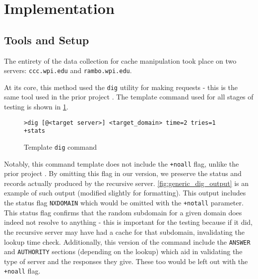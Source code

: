 \section{Implementation}\label{sec:dns_impl} %

\subsection{Tools and Setup}

The entirety of the data collection for \dns cache manipulation took place on two \wpi servers: \texttt{ccc.wpi.edu} and \texttt{rambo.wpi.edu}.

At its core, this method used the \texttt{dig} utility for making \dns requests - this is the same tool used in the prior project \cite{Fakult2019}. The template command used for all stages of testing is shown in \cref{fig:dig_template_command}.

\begin{figure}[h]
    \centering
    \begin{verbatim}
>dig [@<target server>] <target_domain> time=2 tries=1 +stats
    \end{verbatim}
    \caption{Template \texttt{dig} command}
    \label{fig:dig_template_command}
\end{figure}

Notably, this command template does not include the \texttt{+noall} flag, unlike the prior project \cite{Fakult2019}. By omitting this flag in our version, we preserve the status and records actually produced by the recursive \dns server. \cref{fig:generic_dig_output} is an example of such output (modified slightly for formatting). This output includes the status flag \texttt{NXDOMAIN} which would be omitted with the \texttt{+notall} parameter. This status flag confirms that the random subdomain for a given domain does indeed not resolve to anything - this is important for the testing because if it did, the recursive server may have had a cache for that subdomain, invalidating the lookup time check. Additionally, this version of the command include the \texttt{ANSWER} and \texttt{AUTHORITY} sections (depending on the lookup) which aid in validating the type of server and the responses they give. These too would be left out with the \texttt{+noall} flag.


